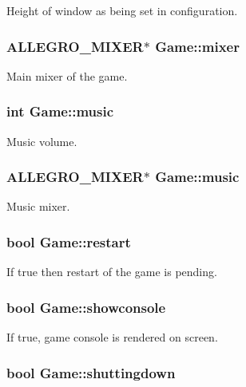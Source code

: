 Height of window as being set in configuration. \hypertarget{structGame_ab8265074be4df5408a7c2fc1fb89dfc4}{
\subsubsection[{mixer}]{\setlength{\rightskip}{0pt plus 5cm}A\+L\+L\+E\+G\+R\+O\+\_\+\+M\+I\+X\+E\+R$\ast$ Game\+::mixer}}\label{structGame_ab8265074be4df5408a7c2fc1fb89dfc4}
Main mixer of the game. \hypertarget{structGame_aa8eff7d132a51e5ca97a376433790426}{
\subsubsection[{music}]{\setlength{\rightskip}{0pt plus 5cm}int Game\+::music}}\label{structGame_aa8eff7d132a51e5ca97a376433790426}
Music volume. \hypertarget{structGame_a49891173b349e56fcda6b0a0e39a47ee}{
\subsubsection[{music}]{\setlength{\rightskip}{0pt plus 5cm}A\+L\+L\+E\+G\+R\+O\+\_\+\+M\+I\+X\+E\+R$\ast$ Game\+::music}}\label{structGame_a49891173b349e56fcda6b0a0e39a47ee}
Music mixer. \hypertarget{structGame_aad2035c807bd99529d1a07e443e0016b}{
\subsubsection[{restart}]{\setlength{\rightskip}{0pt plus 5cm}bool Game\+::restart}}\label{structGame_aad2035c807bd99529d1a07e443e0016b}
If true then restart of the game is pending. \hypertarget{structGame_ab1dafa4ce0c3526439418ac24bf616d8}{
\subsubsection[{showconsole}]{\setlength{\rightskip}{0pt plus 5cm}bool Game\+::showconsole}}\label{structGame_ab1dafa4ce0c3526439418ac24bf616d8}
If true, game console is rendered on screen. \hypertarget{structGame_a9a1d33be7ec00f87ede16b96bd2df312}{
\subsubsection[{shuttingdown}]{\setlength{\rightskip}{0pt plus 5cm}bool Game\+::shuttingdown}}\label{structGame_a9a1d33be7ec00f87ede16b96bd2df312}
